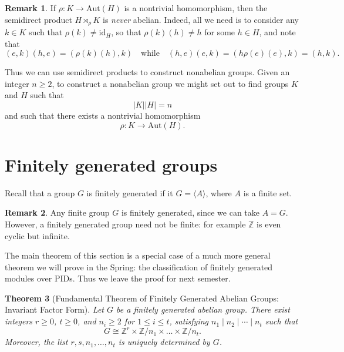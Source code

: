 \documentclass[12pt]{report}
\newtheorem{theorem}{Theorem}[chapter]
\numberwithin{equation}{section}
\numberwithin{theorem}{chapter}
\theoremstyle{definition}
\newtheorem*{basic properties}{Basic Properties}
\newtheorem*{Important Remark}{Important Remark}
\newtheorem{remark}[theorem]{Remark}
\def\sdp{\rtimes}
\begin{document}
\begin{remark}\label{semidirect product nonabliean}
If $\rho\!: K \longrightarrow \mathrm{Aut}(H)$ is a nontrivial homomorphism, then the semidirect product $H \sdp_\rho K$ is \emph{never} abelian. Indeed, all we need is to consider any $k \in K$ such that $\rho(k) \neq \mathrm{id}_H$, so that $\rho(k)(h) \neq h$ for some $h \in H$, and note that
$$(e,k)(h,e) = (\rho(k)(h),k) \quad \text{while} \quad (h,e)(e,k) = (h\rho(e)(e),k) = (h,k).$$
\end{remark}




Thus we can use semidirect products to construct nonabelian groups. 
Given an integer $n \geqslant 2$, to construct a nonabelian group we might set out to find groups $K$ and $H$ such that
$$|K| |H| = n$$
and such that there exists a nontrivial homomorphism
$$\rho\!: K \to \mathrm{Aut}(H).$$


\section{Finitely generated groups}


Recall that a group $G$ is finitely generated if it $G=\langle A \rangle$, where $A$ is a finite set. 

\begin{remark}
Any finite group $G$ is finitely generated, since we can take $A=G$. However, a finitely generated group need not be finite: for example $\mathbb{Z}$ is even cyclic but infinite.
\end{remark}

The main theorem of this section is a special case of a much more general theorem we will prove in the Spring: the classification of finitely generated modules over PIDs. Thus we leave the proof for next semester.

\begin{theorem}[Fundamental Theorem of Finitely Generated Abelian Groups: Invariant Factor Form]\label{finitely generated abelian groups invariant factors} 
Let $G$ be a finitely generated abelian group. There exist integers $r \geqslant 0$, $t \geqslant 0$, and $n_i \geqslant 2$ for $1 \leqslant i \leqslant t$, satisfying $n_1 \mid n_2 \mid \cdots \mid n_t$ such that 
  $$
  G \cong \mathbb{Z}^r \times \mathbb{Z}/n_1 \times \dots \times \mathbb{Z}/n_t.
  $$
  Moreover, the list $r,s,n_1,\ldots , n_t$ is uniquely determined by $G$.
\end{theorem}
\end{document}
